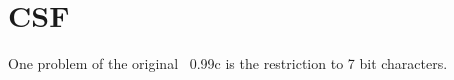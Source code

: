 
\chapter{CSF}

One problem of the original \BibTeX~0.99c is the restriction to 7 bit
characters.


\endinput
%
